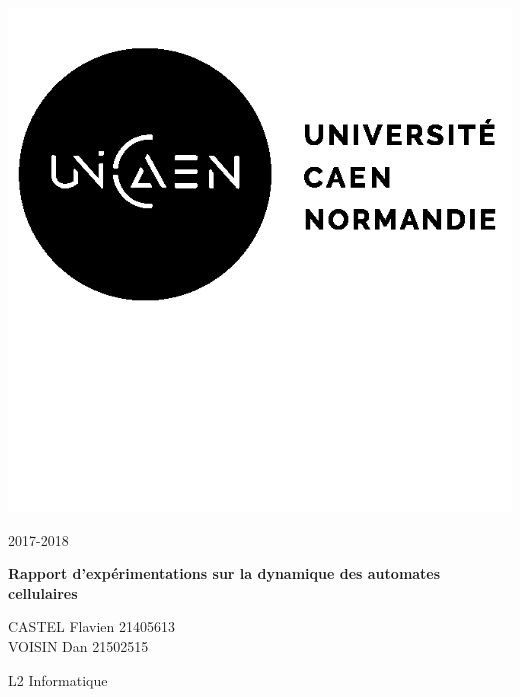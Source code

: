 \documentclass[12pt, a4paper]{article}
\begin{document}
    
    \begin{titlepage}
        \begin{minipage}{.4\linewidth}
            \includegraphics{img/logo.png}
        \end{minipage}
        \hfill
        \begin{minipage}{.4\linewidth}
            \begin{flushright}
                2017-2018
            \end{flushright}
        \end{minipage}
        
        \vspace{7cm}
        
        \begin{center}
            \textbf{\Huge{Rapport d'expérimentations sur la dynamique des automates cellulaires}}
        \end{center}
        
        \vspace{10cm}
        
        \begin{minipage}{.4\linewidth}
            CASTEL Flavien 21405613\\
            VOISIN Dan 21502515
        \end{minipage}
        \hfill
        \begin{minipage}{.4\linewidth}
            \begin{flushright}
                L2 Informatique
            \end{flushright}
        \end{minipage}
    
    \end{titlepage}
    
\end{document}
